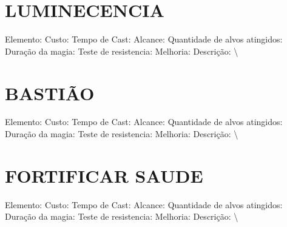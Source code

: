 \documentclass{article}%
\begin{document}
%
\section{LUMINECENCIA}%
\label{sec:LUMINECENCIA}%
Elemento: \newline%
Custo: \newline%
Tempo de Cast: \newline%
Alcance: \newline%
Quantidade de alvos atingidos: \newline%
Duração da magia: \newline%
Teste de resistencia: \newline%
Melhoria: \newline%
Descrição: \textbackslash{}

%
\section{BASTIÃO}%
\label{sec:BASTIO}%
Elemento: \newline%
Custo: \newline%
Tempo de Cast: \newline%
Alcance: \newline%
Quantidade de alvos atingidos: \newline%
Duração da magia: \newline%
Teste de resistencia: \newline%
Melhoria: \newline%
Descrição: \textbackslash{}

%
\section{FORTIFICAR SAUDE}%
\label{sec:FORTIFICARSAUDE}%
Elemento: \newline%
Custo: \newline%
Tempo de Cast: \newline%
Alcance: \newline%
Quantidade de alvos atingidos: \newline%
Duração da magia: \newline%
Teste de resistencia: \newline%
Melhoria: \newline%
Descrição: \textbackslash{}

%
\end{document}
